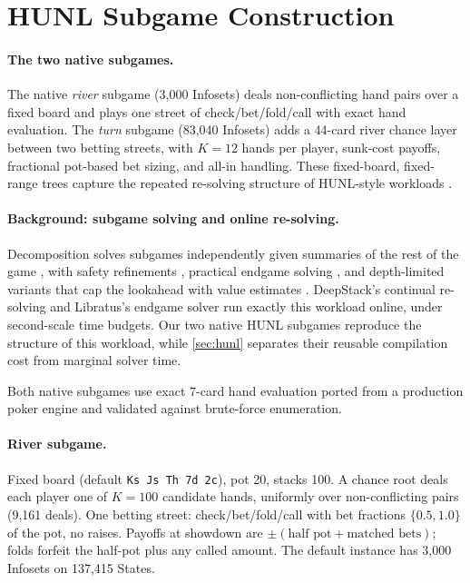 \section{HUNL Subgame Construction}
\label{app:hunl}

\paragraph{The two native subgames.}
The native \emph{river} subgame (3{,}000 Infosets) deals non-conflicting hand pairs over
a fixed board and plays one street of check\slash bet\slash fold\slash call with
exact hand evaluation.
The \emph{turn} subgame (83{,}040 Infosets) adds a 44-card river chance layer between two
betting streets, with $K{=}12$ hands per player, sunk-cost payoffs, fractional
pot-based bet sizing, and all-in handling. These fixed-board, fixed-range trees
capture the repeated re-solving structure of HUNL-style workloads
\cite{burch2014solving,ganzfried2015endgame}.

\paragraph{Background: subgame solving and online re-solving.}
Decomposition solves subgames independently given summaries of the rest of the game
\cite{burch2014solving}, with safety refinements \cite{brown2017safe,zhang2021subgame},
practical endgame solving \cite{ganzfried2015endgame,moravcik2016refining}, and
depth-limited variants that cap the lookahead with value estimates
\cite{brown2018depth,kovavrik2023value,kroer2020limited}. DeepStack's
continual re-solving \cite{moravvcik2017deepstack,vsustr2019monte,sustr2020sound} and
Libratus's endgame solver
\cite{brown2018superhuman} run exactly this workload online, under second-scale time
budgets. Our two native HUNL subgames reproduce the structure of this workload, while
\cref{sec:hunl} separates their reusable compilation cost from marginal solver time.

Both native subgames use exact 7-card hand evaluation ported from a production poker
engine and validated against brute-force enumeration.

\paragraph{River subgame.}
Fixed board (default \texttt{Ks Js Th 7d 2c}), pot 20, stacks 100. A chance root deals
each player one of $K{=}100$ candidate hands, uniformly over non-conflicting pairs
(9{,}161 deals). One betting street: check/bet/fold/call with bet fractions
$\{0.5, 1.0\}$ of the pot, no raises. Payoffs at showdown are $\pm(\text{half pot} +
\text{matched bets})$; folds forfeit the half-pot plus any called amount. The default
instance has 3{,}000 Infosets on 137{,}415 States.

